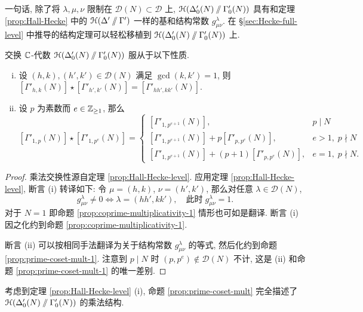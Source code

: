 一句话, 除了将 $\lambda, \mu, \nu$ 限制在 $\mathcal{D}(N) \subset \mathcal{D}$ 上, $\EuScript{H}(\Delta'_0(N) \sslash \Gamma'_0(N))$ 具有和定理 \ref{prop:Hall-Hecke} 中的 $\EuScript{H}(\Delta' \sslash \Gamma')$ 一样的基和结构常数 $g^\lambda_{\mu\nu}$. 在 \S\ref{sec:Hecke-full-level} 中推导的结构定理可以轻松移植到 $\EuScript{H}(\Delta'_0(N) \sslash \Gamma'_0(N))$ 上.

\begin{proposition}\label{prop:prime-coset-mult}
	交换 $\mathbb{C}$-代数 $\EuScript{H}(\Delta'_0(N) \sslash \Gamma'_0(N))$ 服从于以下性质.
	\begin{enumerate}[(i)]
		\item 设 $(h,k), (h',k') \in \mathcal{D}(N)$ 满足 $\gcd(k,k')=1$, 则 $[\Gamma'_{h,k}(N)] \star [\Gamma'_{h',k'}(N)] = [\Gamma'_{hh',kk'}(N)]$.
		\item 设 $p$ 为素数而 $e \in \mathbb{Z}_{\geq 1}$, 那么
		\begin{equation*}
		\left[ \Gamma'_{1,p}(N) \right] \star \left[ \Gamma'_{1, p^e}(N) \right]
		= \begin{cases}
			\left[ \Gamma'_{1,p^{e+1}}(N) \right], & p \mid N \\
			\left[ \Gamma'_{1,p^{e+1}}(N) \right] + p \left[ \Gamma'_{p, p^e}(N) \right], & e > 1, \; p \nmid N \\
			\left[ \Gamma'_{1,p^{e+1}}(N) \right] + (p+1) \left[ \Gamma'_{p, p^e}(N) \right], & e = 1, \; p \nmid N.
		\end{cases}\end{equation*}
	\end{enumerate}
\end{proposition}
\begin{proof}
	乘法交换性源自定理 \ref{prop:Hall-Hecke-level}. 应用定理 \ref{prop:Hall-Hecke-level}, 断言 (i) 转译如下: 令 $\mu = (h,k)$, $\nu = (h',k')$, 那么对任意 $\lambda \in \mathcal{D}(N)$,
	\[ g^\lambda_{\mu\nu} \neq 0 \iff \lambda = (hh', kk'), \quad \text{此时}\; g^\lambda_{\mu\nu} = 1. \]
	对于 $N=1$ 即命题 \ref{prop:coprime-multiplicativity-1} 情形也可如是翻译. 断言 (i) 因之化约到命题 \ref{prop:coprime-multiplicativity-1}.

	断言 (ii) 可以按相同手法翻译为关于结构常数 $g^\lambda_{\mu\nu}$ 的等式, 然后化约到命题 \ref{prop:prime-coset-mult-1}. 注意到 $p \mid N$ 时 $(p,p^e) \notin \mathcal{D}(N)$ 不计, 这是 (ii) 和命题 \ref{prop:prime-coset-mult-1} 的唯一差别.
\end{proof}

考虑到定理 \ref{prop:Hall-Hecke-level} (i), 命题 \ref{prop:prime-coset-mult} 完全描述了 $\EuScript{H}(\Delta'_0(N) \sslash \Gamma'_0(N))$ 的乘法结构.

